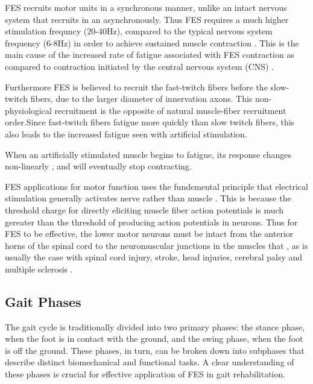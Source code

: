FES recruits motor units in a synchronous manner, unlike an intact nervous system that recruits in an asynchronously. Thus FES requires a much higher stimulation frequncy (20-40Hz), compared to the typical nervous system frequency (6-8Hz) in order to achieve sustained muscle contraction \cite{lynch_functional_2008}. This is the main cause of the increased rate of fatigue associated with FES contraction as compared to contraction initiated by the central nervous system (CNS) \cite{gilman_handbook_1983}. 

Furthermore FES is believed to recruit the fast-twitch fibers before the slow-twitch fibers, due to the larger diameter of innervation axons. This non-physiological recruitment is the opposite of natural muscle-fiber recruitment order.Since fast-twitch fibers fatigue more quickly than slow twitch fibers, this also leads to the increased fatigue seen with artificial stimulation. \cite{lynch_functional_2008}

When an artificially stimulated muscle begins to fatigue, its response changes non-linearly \cite{lynch_functional_2008}, and will eventually stop contracting. 

FES applications for motor function uses the fundemental principle that electrical stimulation generally activates nerve rather than muscle \cite{peckham_functional_2005}. This is because the threshold charge for directly eliciting muscle fiber action potentials is much gereater than the threshold of producing action potentials in neurons. Thus for FES to be effective, the lower motor neurons must be intact from the anterior horns of the spinal cord to the neuromuscular junctions in the muscles that , as is usually the case with spinal cord injury, stroke, head injuries, cerebral palsy and multiple sclerosis \cite{gregory_recruitment_2005}. 

\subsection{Gait Phases}
The gait cycle is traditionally divided into two primary phases: the stance phase, when the foot is in contact with the ground, and the swing phase, when the foot is off the ground. These phases, in turn, can be broken down into subphases that describe distinct biomechanical and functional tasks. A clear understanding of these phases is crucial for effective application of FES in gait rehabilitation.

